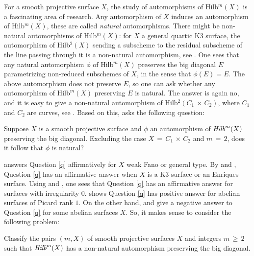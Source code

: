 \documentclass[12pt,reqno]{amsart}
\newenvironment{manualquestion}[1]{%
  \renewcommand\themanualquestioninner{#1}%
  \manualquestioninner
}{\endmanualquestioninner}
\newenvironment{manualproblem}[1]{%
  \renewcommand\themanualprobleminner{#1}%
  \manualprobleminner
}{\endmanualprobleminner}
\theoremstyle{definition}
\numberwithin{equation}{section}
\begin{document}
For a smooth projective surface $X$, the study of automorphisms of Hilb$^m(X)$ is a fascinating area of research. Any automorphism of $X$ induces an automorphism of Hilb$^m(X)$, these are called \textit{natural} automorphisms. There might be non-natural automorphisms of Hilb$^m(X)$: for $X$ a general quartic K3 surface, the automorphism of Hilb$^2(X)$ sending a subscheme to the residual subscheme of the line passing through it is a non-natural automorphism, see {\cite[Section 6]{beauville1983some}}. One sees that any natural automorphism $\phi$ of Hilb$^m(X)$ preserves the big diagonal $E$ parametrizing non-reduced subschemes of $X$, in the sense that $\phi(E)=E.$ The above automorphism does not preserve $E$, so one can ask whether any automorphism of $\text{Hilb}^m(X)$ preserving $E$ is natural. The answer is again no, and it is easy to give a non-natural automorphism of Hilb$^2(C_1\,\times\, C_2)$, where $C_1$ and $C_2$ are curves, see \cite{belmans2020automorphisms}. Based on this, \cite{belmans2020automorphisms} asks the following question:
   

\begin{manualquestion}{1}\label{q}
Suppose $X$ is a smooth projective surface and $\phi$ an automorphism of $\emph{Hilb}^m(X)$ preserving the big diagonal. Excluding the case $X\,=\,C_1\,\times\, C_2$ and $m\,=\,2$, does it follow that $\phi$ is natural?
\end{manualquestion}
 
   
 \cite{belmans2020automorphisms} answers Question \ref{q} affirmatively for $X$ weak Fano or general type. By \cite{boissiere2012note} and {\cite[Theorem 1.2]{hayashi2015universal}}, Question \ref{q} has an affirmative answer when $X$ is a K3 surface or an Enriques surface. Using {\cite[Theorems 2.6, 2.7]{Ha}} and {\cite[Proposition 9]{belmans2020automorphisms}}, one sees that Question \ref{q} has an affirmative answer for surfaces with irregularity $0$. \cite{Gir} shows Question \ref{q} has positive answer for abelian surfaces of Picard rank $1$. On the other hand, \cite{Sas} and \cite{Gir} give a negative answer to Question \ref{q} for some abelian surfaces $X.$ So, it makes sense to consider the following problem:


\begin{manualproblem}{1}\label{p}
Classify the pairs $(m,X)$ of smooth projective surfaces $X$ and integers $m\,\geq\, 2$ such that $\emph{Hilb}^m(X)$ has a non-natural automorphism preserving the big diagonal.   
 \end{manualproblem}
 
\end{document}
